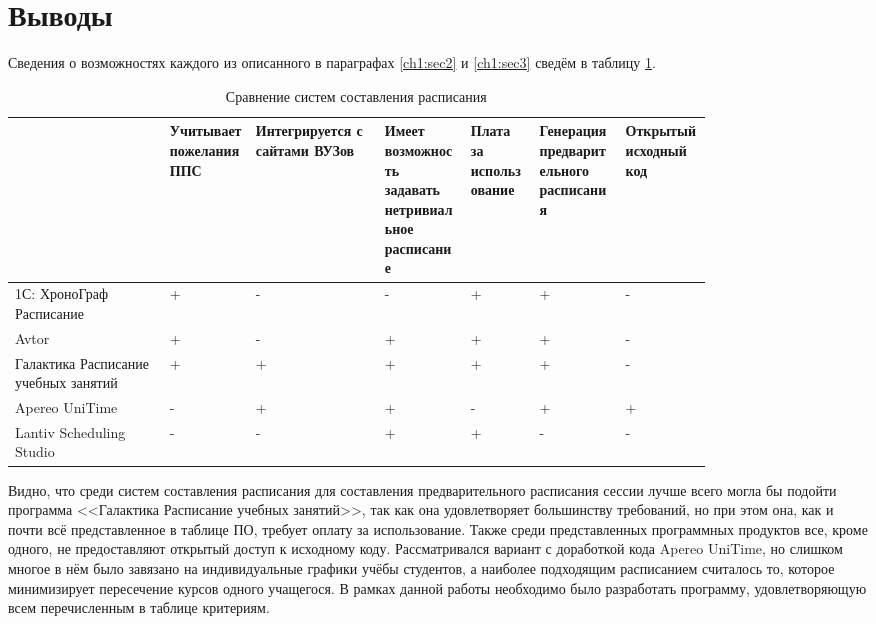 \section{Выводы} \label{ch1:conclusion}
Сведения о возможностях каждого из описанного в параграфах	\ref{ch1:sec2} и \ref{ch1:sec3} сведём в таблицу \ref{tab:1.4.1}.
\begin{table} [htbp]
	\centering\small
	\caption{Сравнение систем составления расписания}%
	\label{tab:1.4.1}	
	\begin{tabular}{|p{0.18\linewidth}|p{0.1\linewidth}|p{0.15\linewidth}|p{0.1\linewidth}|p{0.08\linewidth}|p{0.1\linewidth}|p{0.1\linewidth}|}
		\hline
		&Учитывает пожелания ППС&Интегрируется с сайтами ВУЗов&Имеет возможность задавать нетривиальное расписание&Плата за использование&Генерация предварительного расписания&Открытый исходный код\\
		\hline
		1С: ХроноГраф Расписание&+&-&-&+&+&-\\ \hline
		Avtor&+&-&+&+&+&-\\ \hline
		Галактика Расписание учебных занятий&+&+&+&+&+&-\\ \hline
		Apereo UniTime&-&+&+&-&+&+\\ \hline
		Lantiv Scheduling Studio&-&-&+&+&-&-\\ \hline	
	\end{tabular}
\end{table}

Видно, что среди систем составления расписания для составления предварительного расписания сессии лучше всего могла бы подойти программа <<Галактика Расписание учебных занятий>>, так как она удовлетворяет большинству требований, но при этом она, как и почти всё представленное в таблице ПО, требует оплату за использование. Также среди представленных программных продуктов все, кроме одного, не предоставляют открытый доступ к исходному коду. Рассматривался вариант с доработкой кода Apereo UniTime, но слишком многое в нём было завязано на индивидуальные графики учёбы студентов, а наиболее подходящим расписанием считалось то, которое минимизирует пересечение курсов одного учащегося.
В рамках данной работы необходимо было разработать программу, удовлетворяющую всем перечисленным в таблице критериям.